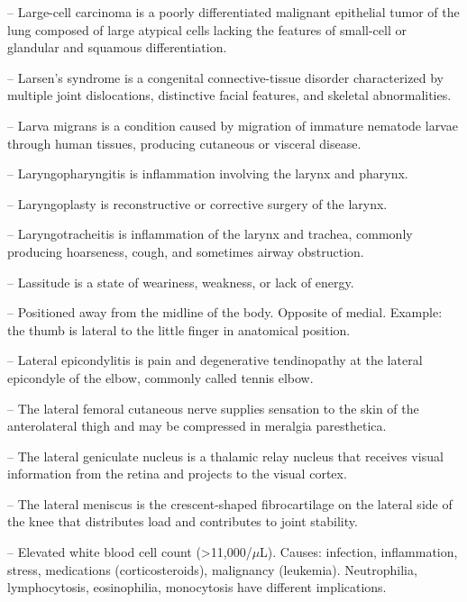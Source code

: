 -- Large-cell carcinoma is a poorly differentiated malignant epithelial tumor of the lung composed of large atypical cells lacking the features of small-cell or glandular and squamous differentiation.

-- Larsen's syndrome is a congenital connective-tissue disorder characterized by multiple joint dislocations, distinctive facial features, and skeletal abnormalities.

-- Larva migrans is a condition caused by migration of immature nematode larvae through human tissues, producing cutaneous or visceral disease.

-- Laryngopharyngitis is inflammation involving the larynx and pharynx.

-- Laryngoplasty is reconstructive or corrective surgery of the larynx.

-- Laryngotracheitis is inflammation of the larynx and trachea, commonly producing hoarseness, cough, and sometimes airway obstruction.

-- Lassitude is a state of weariness, weakness, or lack of energy.

-- Positioned away from the midline of the body. Opposite of medial. Example: the thumb is lateral to the little finger in anatomical position.

-- Lateral epicondylitis is pain and degenerative tendinopathy at the lateral epicondyle of the elbow, commonly called tennis elbow.

-- The lateral femoral cutaneous nerve supplies sensation to the skin of the anterolateral thigh and may be compressed in meralgia paresthetica.

-- The lateral geniculate nucleus is a thalamic relay nucleus that receives visual information from the retina and projects to the visual cortex.

-- The lateral meniscus is the crescent-shaped fibrocartilage on the lateral side of the knee that distributes load and contributes to joint stability.

-- Elevated white blood cell count (>11,000/$\mu$L). Causes: infection, inflammation, stress, medications (corticosteroids), malignancy (leukemia). Neutrophilia, lymphocytosis, eosinophilia, monocytosis have different implications.

